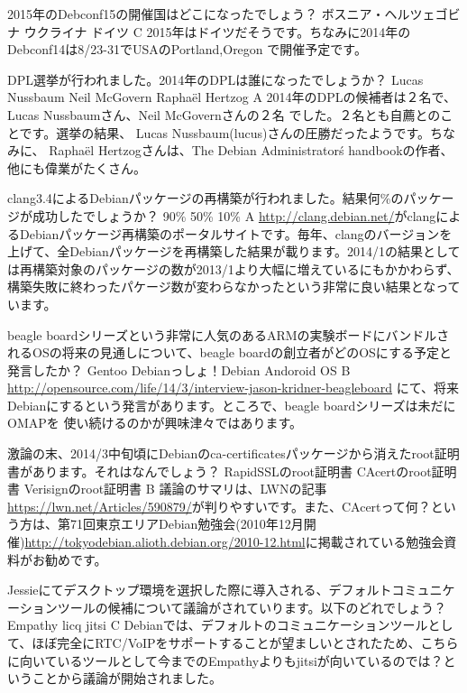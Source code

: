 %

\santaku
{2015年のDebconf15の開催国はどこになったでしょう？}
{ボスニア・ヘルツェゴビナ}
{ウクライナ}
{ドイツ}
{C}
{2015年はドイツだそうです。ちなみに2014年のDebconf14は8/23-31でUSAのPortland,Oregon
で開催予定です。}

\santaku
{DPL選挙が行われました。2014年のDPLは誰になったでしょうか？}
{Lucas Nussbaum}
{Neil McGovern}
{Rapha\"{e}l Hertzog}
{A}
{2014年のDPLの候補者は２名で、Lucas Nussbaumさん、Neil McGovernさんの２名
でした。２名とも自薦とのことです。選挙の結果、
Lucas Nussbaum(lucus)さんの圧勝だったようです。ちなみに、
Rapha\"{e}l Hertzogさんは、The Debian 
Administrator\'s handbookの作者、他にも偉業がたくさん。}

\santaku
{clang3.4によるDebianパッケージの再構築が行われました。結果何\%のパッケージが成功したでしょうか？}
{90\%}
{50\%}
{10\%}
{A}
{\url {http://clang.debian.net/}がclangによるDebianパッケージ再構築のポータルサイトです。毎年、clangのバージョンを上げて、全Debianパッケージを再構築した結果が載ります。2014/1の結果としては再構築対象のパッケージの数が2013/1より大幅に増えているにもかかわらず、構築失敗に終わったパケージ数が変わらなかったという非常に良い結果となっています。}

\santaku
{beagle boardシリーズという非常に人気のあるARMの実験ボードにバンドルされるOSの将来の見通しについて、beagle boardの創立者がどのOSにする予定と発言したか？}
{Gentoo}
{Debianっしょ！Debian}
{Andoroid OS}
{B}
{\url{http://opensource.com/life/14/3/interview-jason-kridner-beagleboard}
にて、将来Debianにするという発言があります。ところで、beagle boardシリーズは未だにOMAPを
使い続けるのかが興味津々ではあります。}

\santaku
{激論の末、2014/3中旬頃にDebianのca-certificatesパッケージから消えたroot証明書があります。それはなんでしょう？}
{RapidSSLのroot証明書}
{CAcertのroot証明書}
{Verisignのroot証明書}
{B}
{議論のサマリは、LWNの記事\url{https://lwn.net/Articles/590879/}が判りやすいです。また、CAcertって何？という方は、第71回東京エリアDebian勉強会(2010年12月開催)\url{http://tokyodebian.alioth.debian.org/2010-12.html}に掲載されている勉強会資料がお勧めです。}

\santaku
{Jessieにてデスクトップ環境を選択した際に導入される、デフォルトコミュニケーションツールの候補について議論がされていります。以下のどれでしょう？}
{Empathy}
{licq}
{jitsi}
{C}
{Debianでは、デフォルトのコミュニケーションツールとして、ほぼ完全にRTC/VoIPをサポートすることが望ましいとされたため、こちらに向いているツールとして今までのEmpathyよりもjitsiが向いているのでは？ということから議論が開始されました。}

